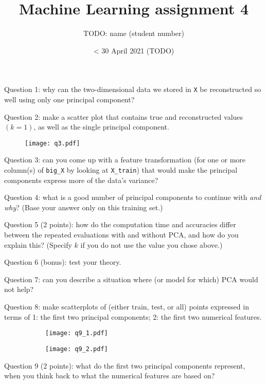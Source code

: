 \documentclass[12pt]{article}
\title{Machine Learning assignment 4}
\author{TODO: name (student number)}
\date{< 30 April 2021 (TODO)}
\newcommand{\question}[1]{{\large \textcolor{BrickRed}{Question #1}}}
\begin{document}
\maketitle

\question{1: why can the two-dimensional data we stored in \texttt{X} be reconstructed so well using only one principal component?}



\question{2: make a scatter plot that contains true and reconstructed values $(k=1)$, as well as the single principal component.}
\begin{figure}[h]
    \centering
    \texttt{[image: q3.pdf]}
    \caption{}
    \label{fig:q3}
\end{figure}

\pagebreak[4]

\question{3: can you come up with a feature transformation (for one or more column(s) of \texttt{big\_X} by looking at \texttt{X\_train}) that would make the principal components express more of the data's variance?}



\question{4: what is a good number of principal components to continue with \textit{and why}? (Base your answer only on this training set.)}



\question{5 (2 points): how do the computation time and accuracies differ between the repeated evaluations with and without PCA, and how do you explain this? (Specify $k$ if you do not use the value you chose above.)}



\question{6 (bonus): test your theory.}



\pagebreak[4]

\question{7: can you describe a situation where (or model for which) PCA would not help?}




\question{8: make scatterplots of (either train, test, or all) points expressed in terms of 1: the first two principal components; 2: the first two numerical features.}
\begin{figure}[h]
    \centering
    \begin{subfigure}{.49\textwidth}
        \texttt{[image: q9\_1.pdf]}
    \end{subfigure}
    \begin{subfigure}{.49\textwidth}
        \texttt{[image: q9\_2.pdf]}
    \end{subfigure}
    \caption{}
    \label{fig:q9}
\end{figure}

\question{9 (2 points): what do the first two principal components represent, when you think back to what the numerical features are based on?}
\end{document}
